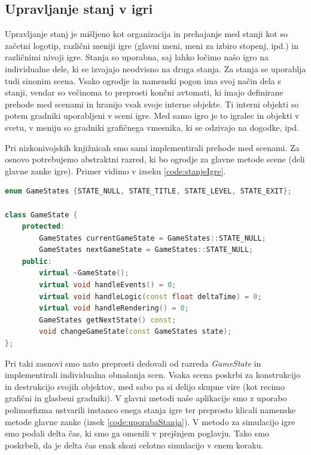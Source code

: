 \documentclass[12pt,a4paper,twoside]{book}
\begin{document}
\subsection{Upravljanje stanj v igri}
Upravljanje stanj je mišljeno kot organizacija in prehajanje med stanji kot so začetni logotip, različni meniji igre (glavni meni, meni za izbiro stopenj, ipd.) in različnimi nivoji igre. Stanja so uporabna, saj lahko ločimo našo igro na individualne dele, ki se izvajajo neodvisno na druga stanja. Za stanja se uporablja tudi sinonim scena. Vsako ogrodje in namenski pogon ima svoj način dela s stanji, vendar so večinoma to preprosti končni avtomati, ki imajo definirane prehode med scenami in hranijo vsak svoje interne objekte. Ti interni objekti so potem gradniki uporabljeni v sceni igre. Med samo igro je to igralec in objekti v svetu, v meniju so gradniki grafičnega vmesnika, ki se odzivajo na dogodke, ipd.

Pri nizkonivojskih knjižnicah smo sami implementirali prehode med scenami. Za osnovo potrebujemo abstraktni razred, ki bo ogrodje za glavne metode scene (deli glavne zanke igre). Primer vidimo v izseku \ref{code:stanjeIgre}.

\begin{lstlisting}[label=code:stanjeIgre, language=C++, caption=Stanje igre]
enum GameStates {STATE_NULL, STATE_TITLE, STATE_LEVEL, STATE_EXIT};

class GameState {
	protected:
		GameStates currentGameState = GameStates::STATE_NULL;
		GameStates nextGameState = GameStates::STATE_NULL;
	public:
		virtual ~GameState();
		virtual void handleEvents() = 0;
		virtual void handleLogic(const float deltaTime) = 0;
		virtual void handleRendering() = 0;
		GameStates getNextState() const;
		void changeGameState(const GameStates state);
};
\end{lstlisting}

Pri taki zasnovi smo nato preprosti dedovali od razreda \textit{GameState} in implementirali individualna obnašanja scen. Vsaka scena poskrbi za konstrukcijo in destrukcijo svojih objektov, med sabo pa si delijo skupne vire (kot recimo grafični in glasbeni gradniki). V glavni metodi naše aplikacije smo z uporabo polimorfizma ustvarili instanco enega stanja igre ter preprosto klicali namenske metode glavne zanke (izsek \ref{code:uporabaStanja}). V metodo za simulacijo igre smo podali delta čas, ki smo ga omenili v prejšnjem poglavju. Tako smo poskrbeli, da je delta čas enak skozi celotno simulacijo v enem koraku.
\end{document}
